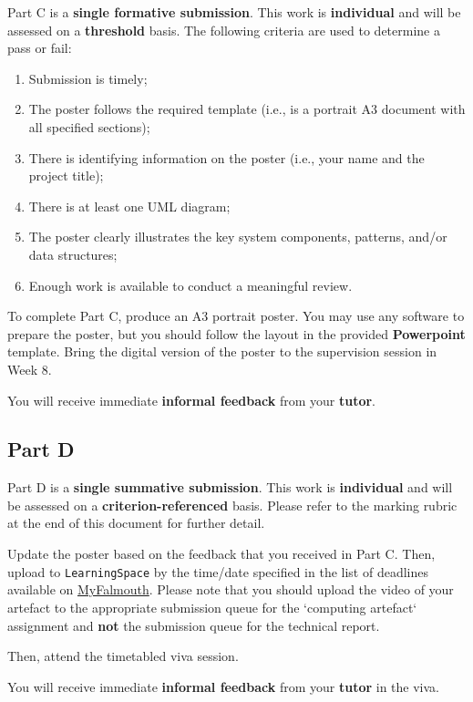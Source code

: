 \documentclass{../../fal_assignment}
\begin{document}
Part C is a \textbf{single formative submission}. This work is \textbf{individual} and will be assessed on a \textbf{threshold} basis.  The following criteria are used to determine a pass or fail:

\begin{enumerate}[label=(\alph*)]
	\item Submission is timely;
	\item The poster follows the required template  (i.e., is a portrait A3 document with all specified sections);
	\item There is identifying information on the poster (i.e., your name and the project title);
	\item There is at least one UML diagram;
	\item The poster clearly illustrates the key system components, patterns, and/or data structures;
	\item Enough work is available to conduct a meaningful review.
\end{enumerate}

To complete Part C, produce an A3 portrait poster. You may use any software to prepare the poster, but you should follow the layout in the provided \textbf{Powerpoint} template.  Bring the digital version of the poster to the supervision session in Week 8.

You will receive immediate \textbf{informal feedback} from your \textbf{tutor}.

\subsection*{Part D}

Part D is a \textbf{single summative submission}. This work is \textbf{individual} and will be assessed on a \textbf{criterion-referenced} basis.  Please refer to the marking rubric at the end of this document for further detail.

Update the poster based on the feedback that you received in Part C. Then, upload to \texttt{LearningSpace} by the time/date specified in the list of deadlines available on \href{http://myfalmouth.falmouth.ac.uk}{MyFalmouth}. Please note that you should upload the video of your artefact to the appropriate submission queue for the `computing artefact` assignment and \textbf{not} the submission queue for the technical report. 

Then, attend the timetabled viva session.

You will receive immediate \textbf{informal feedback} from your \textbf{tutor} in the viva.
\end{document}
